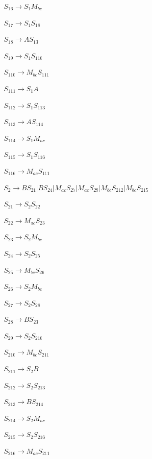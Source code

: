 \documentclass{article}%
\begin{document}
\begin{enumerate}
\begin{enumerate}
	$S_{16} \rightarrow S_1M_{bc}$
	
	$S_{17} \rightarrow S_1S_{18}$
	
	$S_{18} \rightarrow AS_{13}$
	
	$S_{19} \rightarrow S_1S_{110}$
	
	$S_{110} \rightarrow M_{bc}S_{111}$
	
	$S_{111} \rightarrow S_1A$
	
	$S_{112} \rightarrow S_1S_{113}$
	
	$S_{113} \rightarrow AS_{114}$
	
	$S_{114} \rightarrow S_1M_{ac}$
	
    $S_{115} \rightarrow S_1S_{116}$
    
    $S_{116} \rightarrow M_{ac}S_{111}$
	  
		
	$S_2 \rightarrow B S_{21} | B S_{24} | M_{ac}S_{27} | M_{ac}S_{29} | M_{bc}S_{212} | M_{bc}S_{215}$
	
	$S_{21} \rightarrow S_2S_{22}$
	
	$S_{22} \rightarrow M_{ac}S_{23}$
	
	$S_{23} \rightarrow S_2M_{bc}$
	
	$S_{24} \rightarrow S_2S_{25}$
	
	$S_{25} \rightarrow M_{bc}S_{26}$
	
	$S_{26} \rightarrow S_2M_{bc}$
	
	$S_{27} \rightarrow S_2S_{28}$
	
	$S_{28} \rightarrow BS_{23}$
	
	$S_{29} \rightarrow S_2S_{210}$
	
	$S_{210} \rightarrow M_{bc}S_{211}$
	
	$S_{211} \rightarrow S_2B$
	
	$S_{212} \rightarrow S_2S_{213}$
	
	$S_{213} \rightarrow BS_{214}$
	
	$S_{214} \rightarrow S_2M_{ac}$
	
    $S_{215} \rightarrow S_2S_{216}$
    
    $S_{216} \rightarrow M_{ac}S_{211}$
    


\end{enumerate}
\end{enumerate}
\end{document}
